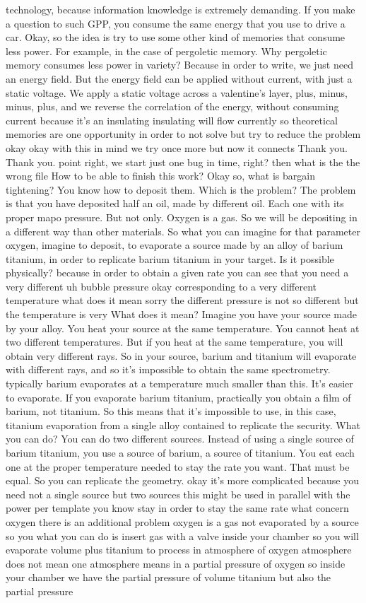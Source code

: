 technology, because information knowledge is extremely demanding. If you make a question to such GPP, you consume the same energy that you use to drive a car. Okay, so the idea is try to use some other kind of memories that consume less power. For example, in the case of pergoletic memory. Why pergoletic memory consumes less power in variety? Because in order to write, we just need an energy field. But the energy field can be applied without current, with just a static voltage. We apply a static voltage across a valentine's layer, plus, minus, minus, plus, and we reverse the correlation of the energy, without consuming current because it's an insulating insulating will flow currently so theoretical memories are one opportunity in order to not solve but try to reduce the problem okay okay with this in mind we try once more but now it connects Thank you. Thank you. point right, we start just one bug in time, right? then what is the the wrong file How to be able to finish this work? Okay so, what is bargain tightening? You know how to deposit them. Which is the problem? The problem is that you have deposited half an oil, made by different oil. Each one with its proper mapo pressure. But not only. Oxygen is a gas. So we will be depositing in a different way than other materials. So what you can imagine for that parameter oxygen, imagine to deposit, to evaporate a source made by an alloy of barium titanium, in order to replicate barium titanium in your target. Is it possible physically? because in order to obtain a given rate you can see that you need a very different uh bubble pressure okay corresponding to a very different temperature what does it mean sorry the different pressure is not so different but the temperature is very What does it mean? Imagine you have your source made by your alloy. You heat your source at the same temperature. You cannot heat at two different temperatures. But if you heat at the same temperature, you will obtain very different rays. So in your source, barium and titanium will evaporate with different rays, and so it's impossible to obtain the same spectrometry. typically barium evaporates at a temperature much smaller than this. It's easier to evaporate. If you evaporate barium titanium, practically you obtain a film of barium, not titanium. So this means that it's impossible to use, in this case, titanium evaporation from a single alloy contained to replicate the security. What you can do? You can do two different sources. Instead of using a single source of barium titanium, you use a source of barium, a source of titanium. You eat each one at the proper temperature needed to stay the rate you want. That must be equal. So you can replicate the geometry. okay it's more complicated because you need not a single source but two sources this might be used in parallel with the power per template you know stay in order to stay the same rate what concern oxygen there is an additional problem oxygen is a gas not evaporated by a source so you what you can do is insert gas with a valve inside your chamber so you will evaporate volume plus titanium to process in atmosphere of oxygen atmosphere does not mean one atmosphere means in a partial pressure of oxygen so inside your chamber we have the partial pressure of volume titanium but also the partial pressure 